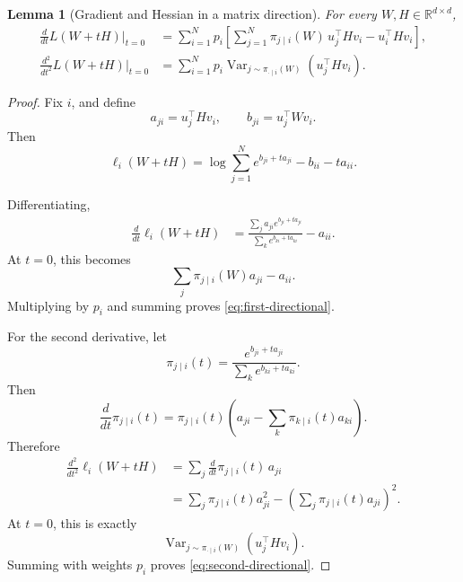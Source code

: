 \documentclass[11pt]{article}
\newtheorem{lemma}[theorem]{Lemma}
\newcommand{\R}{\mathbb{R}}
\newcommand{\1}{\mathbf{1}}
\newcommand{\Var}{\operatorname{Var}}
\begin{document}
\begin{lemma}[Gradient and Hessian in a matrix direction]
\label{lem:hessian}
For every \(W,H\in\R^{d\times d}\),
\begin{align}
\frac{d}{dt}L(W+tH)\bigg|_{t=0}
&=
\sum_{i=1}^{N}p_i
\left[
\sum_{j=1}^{N}
\pi_{j\mid i}(W)\,
u_j^\top Hv_i
-
u_i^\top Hv_i
\right],
\label{eq:first-directional}
\\
\frac{d^2}{dt^2}L(W+tH)\bigg|_{t=0}
&=
\sum_{i=1}^{N}p_i
\Var_{j\sim\pi_{\cdot\mid i}(W)}
\left(
u_j^\top Hv_i
\right).
\label{eq:second-directional}
\end{align}
\end{lemma}

\begin{proof}
Fix \(i\), and define
\[
a_{ji}=u_j^\top Hv_i,
\qquad
b_{ji}=u_j^\top Wv_i.
\]
Then
\[
\ell_i(W+tH)
=
\log\sum_{j=1}^{N}e^{b_{ji}+ta_{ji}}
-
b_{ii}
-
ta_{ii}.
\]

Differentiating,
\begin{align*}
\frac{d}{dt}\ell_i(W+tH)
&=
\frac{
\sum_j a_{ji}e^{b_{ji}+ta_{ji}}
}{
\sum_k e^{b_{ki}+ta_{ki}}
}
-
a_{ii}.
\end{align*}
At \(t=0\), this becomes
\[
\sum_j\pi_{j\mid i}(W)a_{ji}-a_{ii}.
\]
Multiplying by \(p_i\) and summing proves
\eqref{eq:first-directional}.

For the second derivative, let
\[
\pi_{j\mid i}(t)
=
\frac{
e^{b_{ji}+ta_{ji}}
}{
\sum_k e^{b_{ki}+ta_{ki}}
}.
\]
Then
\[
\frac{d}{dt}\pi_{j\mid i}(t)
=
\pi_{j\mid i}(t)
\left(
a_{ji}
-
\sum_k\pi_{k\mid i}(t)a_{ki}
\right).
\]
Therefore
\begin{align*}
\frac{d^2}{dt^2}\ell_i(W+tH)
&=
\sum_j
\frac{d}{dt}\pi_{j\mid i}(t)\,a_{ji}
\\
&=
\sum_j\pi_{j\mid i}(t)a_{ji}^2
-
\left(
\sum_j\pi_{j\mid i}(t)a_{ji}
\right)^2.
\end{align*}
At \(t=0\), this is exactly
\[
\Var_{j\sim\pi_{\cdot\mid i}(W)}
\left(
u_j^\top Hv_i
\right).
\]
Summing with weights \(p_i\) proves
\eqref{eq:second-directional}.
\end{proof}
\end{document}
